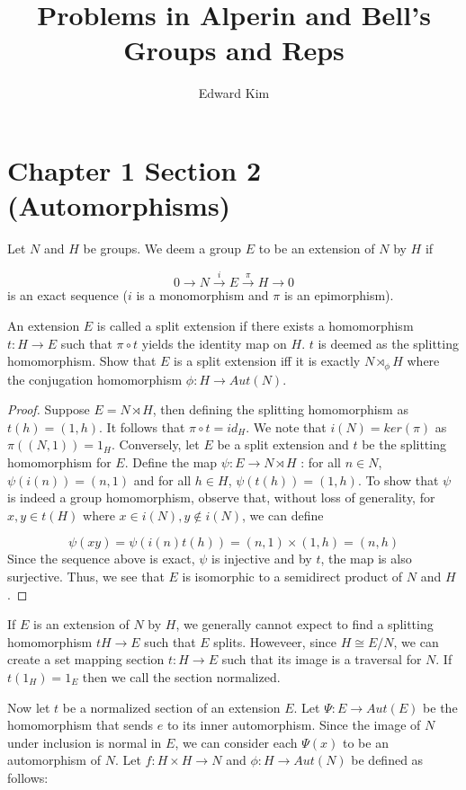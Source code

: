 \documentclass[12pt]{article}
\title{Problems in Alperin and Bell's Groups and Reps}
\author{Edward Kim}
\begin{document}
\maketitle
\clearpage

\section{Chapter 1 Section 2 (Automorphisms)}

Let $N$ and $H$ be groups. We deem a group $E$ to be an extension of $N$ by $H$ if 

$$ 0 \rightarrow N \xrightarrow{i} E \xrightarrow{\pi} H \rightarrow 0 $$ is an exact sequence ($i$ is a monomorphism and $\pi$ is an epimorphism).

An extension $E$ is called a split extension if there exists a homomorphism $t: H \rightarrow E$ such that 
$\pi \circ t$ yields the identity map on $H$. $t$ is deemed as the splitting homomorphism. Show that $E$ is a split extension iff it is exactly $N \rtimes_{\phi} H$ where the conjugation homomorphism $\phi: H \rightarrow Aut(N)$. 

\begin{proof}
Suppose $E = N \rtimes H$, then defining the splitting homomorphism as $t(h) = (1,h)$. It follows that $\pi \circ t = id_H$. We note that $i(N) = ker(\pi)$ as $\pi((N,1)) = 1_H$. Conversely, let $E$ be a split extension and $t$ be the splitting homomorphism for $E$. Define the map $\psi: E \rightarrow N \rtimes H$ : for all $n \in N$, $\psi(i(n)) = (n,1)$ and for all $h \in H$, $\psi(t(h)) = (1,h)$. To show that $\psi$ is indeed a group homomorphism, observe that, without loss of generality, for $x,y \in t(H)$ where $x \in i(N), y\not\in i(N)$, we can define 

$$\psi(xy) = \psi(i(n)t(h)) = (n,1) \times (1,h) = (n,h)  $$ Since the sequence above is exact, $\psi$ is injective and by $t$, the map is also surjective. Thus, we see that $E$ is isomorphic to a semidirect product of $N$ and $H$.  
\end{proof}  

If $E$ is an extension of $N$ by $H$, we generally cannot expect to find a splitting homomorphism $t H \rightarrow E$ such that $E$ splits. Howeveer, since $H \cong E/N$, we can create a set mapping section $t: H \rightarrow E$ such that its image is a traversal for $N$. If $t(1_H) = 1_E$ then we call the section normalized.

Now let $t$ be a normalized section of an extension $E$. Let $\Psi: E \rightarrow Aut(E)$ be the homomorphism that sends $e$ to its inner automorphism. Since the image of $N$ under inclusion is normal in $E$, we can consider each $\Psi(x)$ to be an automorphism of $N$. Let $f: H \times H \rightarrow N$ and $\phi: H \rightarrow Aut(N)$ be defined as follows:
\end{document}
